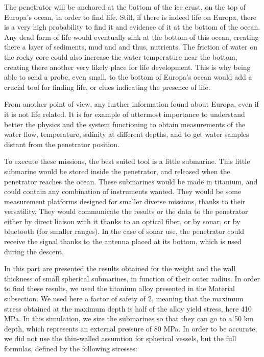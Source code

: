 
The penetrator will be anchored at the bottom of the ice crust, on the top of Europa's ocean, in order to find life. Still, if there is indeed life on Europa, there is a very high probability to find it and evidence of it at the bottom of the ocean. Any dead form of life would eventually sink at the bottom of this ocean, creating there a layer of sediments, mud and and thus, nutrients. The friction of water on the rocky core could also increase the water temperature near the bottom, creating there another very likely place for life development. This is why being able to send a probe, even small, to the bottom of Europa's ocean would add a crucial tool for finding life, or clues indicating the presence of life.


From another point of view, any further information found about Europa, even if it is not life related. It is for example of uttermost importance to understand better the physics and the system functioning to obtain measurements of the water flow, temperature, salinity at different depths, and to get water samples distant from the penetrator position.


To execute these missions, the best suited tool is a little submarine. This little submarine would be stored inside the penetrator, and released when the penetrator  reaches the ocean. These submarines would be made in titanium, and could contain any combination of instruments wanted. They would be some measurement platforms designed for smaller diverse missions, thanks to their versatility. They would communicate the results or the data to the penetrator either by direct liaison with it thanks to an optical fiber, or by sonar, or by bluetooth (for smaller ranges). In the case of sonar use, the penetrator could receive the signal thanks to the antenna placed at its bottom, which is used during the descent.


In this part are presented the results obtained for the weight and the wall thickness of small spherical submarines, in function of their outer radius. In order to find these results, we used the titanium alloy presented in the Material subsection. We used here a factor of safety of 2, meaning that the maximum stress obtained at the maximum depth is half of the alloy yield stress, here 410 MPa. In this simulation, we size the submarines so that they can go to a 50 km depth, which represents an external pressure of 80 MPa. In order to be accurate, we did not use the thin-walled assumtion for spherical vessels, but the full formulas, defined by the following stresses:

